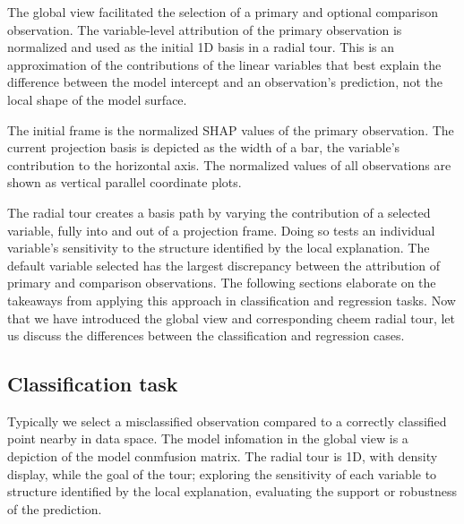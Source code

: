 \documentclass[
]{article}
\begin{document}
The global view facilitated the selection of a primary and optional comparison observation. The variable-level attribution of the primary observation is normalized and used as the initial 1D basis in a radial tour. This is an approximation of the contributions of the linear variables that best explain the difference between the model intercept and an observation's prediction, not the local shape of the model surface.

The initial frame is the normalized SHAP values of the primary observation. The current projection basis is depicted as the width of a bar, the variable's contribution to the horizontal axis. The normalized values of all observations are shown as vertical parallel coordinate plots.

The radial tour creates a basis path by varying the contribution of a selected variable, fully into and out of a projection frame. Doing so tests an individual variable's sensitivity to the structure identified by the local explanation. The default variable selected has the largest discrepancy between the attribution of primary and comparison observations. The following sections elaborate on the takeaways from applying this approach in classification and regression tasks. Now that we have introduced the global view and corresponding cheem radial tour, let us discuss the differences between the classification and regression cases.

\hypertarget{classification-task}{%
\subsection{Classification task}\label{classification-task}}

Typically we select a misclassified observation compared to a correctly classified point nearby in data space. The model infomation in the global view is a depiction of the model conmfusion matrix. The radial tour is 1D, with density display, while the goal of the tour; exploring the sensitivity of each variable to structure identified by the local explanation, evaluating the support or robustness of the prediction.
\end{document}
